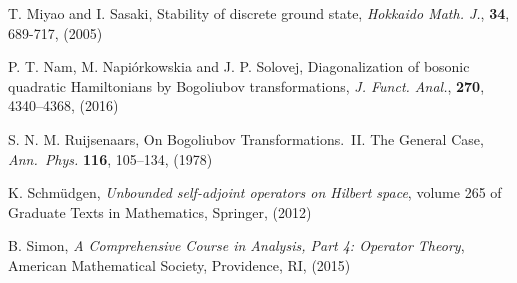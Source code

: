 \documentclass[12pt,draft]{article}
\theoremstyle{plain}
\numberwithin{equation}{section}
\theoremstyle{remark}
\begin{document}
{\begin{thebibliography}{00}
  {T. Miyao and I. Sasaki},
  {Stability of discrete ground state}, 
  \textit{Hokkaido Math. J.}, \textbf{34}, 689-717, (2005)

 {P. T. Nam, M. Napi\'{o}rkowskia and J. P. Solovej},
 {Diagonalization of bosonic quadratic Hamiltonians by Bogoliubov transformations},
 \textit{J. Funct. Anal.}, \textbf{270}, 4340--4368, (2016)

  {S. N. M. Ruijsenaars},
  {On Bogoliubov Transformations.\ II. The General Case}, 
  \textit{Ann.\ Phys.} \textbf{116}, {105--134}, (1978)

  {K. Schm\"udgen},
  \textit{Unbounded self-adjoint operators on Hilbert space}, 
  volume 265 of Graduate Texts in Mathematics, Springer, (2012)

 {B. Simon},
 \textit{A Comprehensive Course in Analysis, Part 4: Operator Theory}, 
 American Mathematical Society, Providence, RI, (2015)
\end{thebibliography}
}

\end{document}
